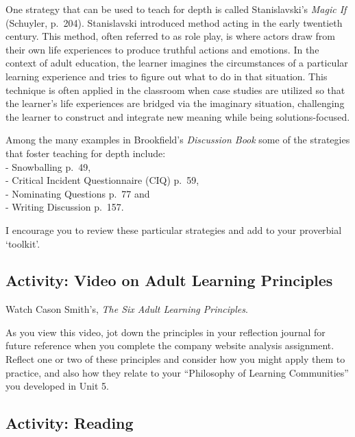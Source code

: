 \documentclass[
]{book}
\begin{document}
One strategy that can be used to teach for depth is called
Stanislavski's \emph{Magic If} (Schuyler, p.~204). Stanislavski introduced
method acting in the early twentieth century. This method, often
referred to as role play, is where actors draw from their own life
experiences to produce truthful actions and emotions. In the context of
adult education, the learner imagines the circumstances of a particular
learning experience and tries to figure out what to do in that
situation. This technique is often applied in the classroom when case
studies are utilized so that the learner's life experiences are bridged
via the imaginary situation, challenging the learner to construct and
integrate new meaning while being solutions-focused.

Among the many examples in Brookfield's \emph{Discussion Book} some of the strategies that foster teaching for depth include:\\
- Snowballing p.~49,\\
- Critical Incident Questionnaire (CIQ) p.~59,\\
- Nominating Questions p.~77 and\\
- Writing Discussion p.~157.

I encourage you to review these particular strategies and add to your proverbial `toolkit'.

\hypertarget{activity-video-on-adult-learning-principles}{%
\subsection{Activity: Video on Adult Learning Principles}\label{activity-video-on-adult-learning-principles}}

\begin{reflect}
Watch Cason Smith's, \emph{The Six Adult Learning Principles}.

As you view this video, jot down the principles in your reflection
journal for future reference when you complete the company website
analysis assignment. Reflect one or two of these principles and consider
how you might apply them to practice, and also how they relate to your
``Philosophy of Learning Communities'' you developed in Unit 5.
\end{reflect}

\hypertarget{activity-reading-1}{%
\subsection{Activity: Reading}\label{activity-reading-1}}
\end{document}
